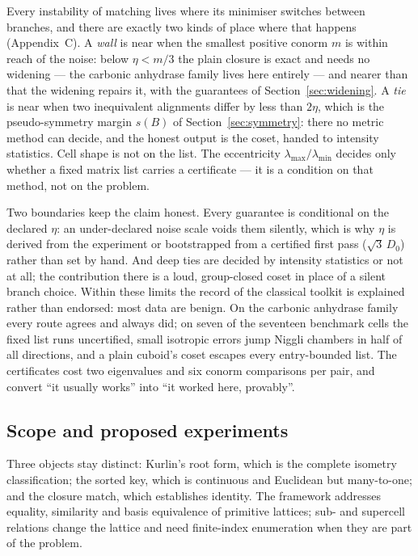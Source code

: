 \documentclass[preprint,pdf]{iucr}          %
\begin{document}
Every instability of matching lives where its minimiser switches between branches, and there are exactly two kinds of place where that happens (Appendix~C). A \emph{wall} is near when the smallest positive conorm $m$ is within reach of the noise: below $\eta<m/3$ the plain closure is exact and needs no widening --- the carbonic anhydrase family lives here entirely --- and nearer than that the widening repairs it, with the guarantees of Section~\ref{sec:widening}. A \emph{tie} is near when two inequivalent alignments differ by less than $2\eta$, which is the pseudo-symmetry margin $s(B)$ of Section~\ref{sec:symmetry}: there no metric method can decide, and the honest output is the coset, handed to intensity statistics. Cell shape is not on the list. The eccentricity $\lambda_{\max}/\lambda_{\min}$ decides only whether a fixed matrix list carries a certificate --- it is a condition on that method, not on the problem.

Two boundaries keep the claim honest. Every guarantee is conditional on the declared $\eta$: an under-declared noise scale voids them silently, which is why $\eta$ is derived from the experiment or bootstrapped from a certified first pass ($\sqrt3\,D_0$) rather than set by hand. And deep ties are decided by intensity statistics or not at all; the contribution there is a loud, group-closed coset in place of a silent branch choice. Within these limits the record of the classical toolkit is explained rather than endorsed: most data are benign. On the carbonic anhydrase family every route agrees and always did; on seven of the seventeen benchmark cells the fixed list runs uncertified, small isotropic errors jump Niggli chambers in half of all directions, and a plain cuboid's coset escapes every entry-bounded list. The certificates cost two eigenvalues and six conorm comparisons per pair, and convert ``it usually works'' into ``it worked here, provably''.

\subsection{Scope and proposed experiments}

Three objects stay distinct: Kurlin's root form, which is the complete isometry classification; the sorted key, which is continuous and Euclidean but many-to-one; and the closure match, which establishes identity. The framework addresses equality, similarity and basis equivalence of primitive lattices; sub- and supercell relations change the lattice and need finite-index enumeration when they are part of the problem.
\end{document}
